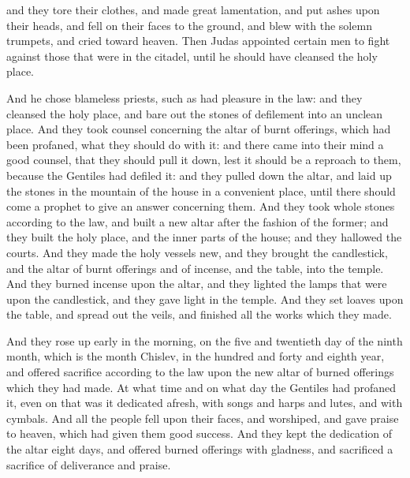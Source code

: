 {and they tore their clothes, and made great lamentation, and put ashes upon their heads,
and fell on their faces to the ground, and
 blew with the
 solemn trumpets, and cried toward heaven.
Then Judas appointed certain men to fight against those that were in the citadel, until he should have cleansed the holy place.
\par }{\PP {}And he chose blameless priests, such as had pleasure in the law:
and they cleansed the holy place, and bare out the stones of defilement into an unclean place.
And they took counsel concerning the altar of burnt offerings, which had been profaned, what they should do with it:
and there came into their mind a good counsel, that they should pull it down, lest it should be a reproach to them, because the Gentiles had defiled it: and they pulled down the altar,
and laid up the stones in the mountain of the house in a convenient place, until there should come a prophet to give an answer concerning them.
And they took whole stones according to the law, and built a new altar after the fashion of the former;
and they built the holy place, and the inner parts of the house; and they hallowed the courts.
And they made the holy vessels new, and they brought the candlestick, and the altar of burnt offerings and of incense, and the table, into the temple.
And they burned incense upon the altar, and they lighted the lamps that were upon the candlestick, and they gave light in the temple.
And they set loaves upon the table, and spread out the veils, and finished all the works which they made.
\par }{\PP {}And they rose up early in the morning, on the five and twentieth day of the ninth month, which is the month Chislev, in
 the hundred and forty and eighth year,
and offered sacrifice according to the law upon the new altar of burned offerings which they had made.
At what time and on what day the Gentiles had profaned it, even on that
{} was it dedicated afresh, with songs and harps and lutes, and with cymbals.
And all the people fell upon their faces, and worshiped, and
 gave praise to heaven, which had given them good success.
And they kept the dedication of the altar eight days, and offered burned offerings with gladness, and sacrificed a sacrifice of deliverance and praise.
}
